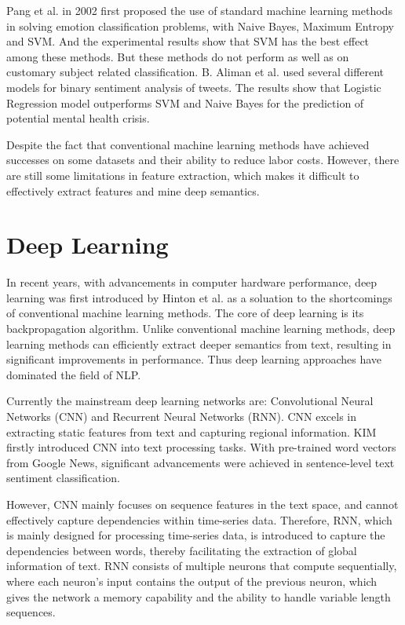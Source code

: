 \documentclass[ %
                    author={Louis Wang},
                supervisor={Dr. Qiang Liu},
                    degree={MSc},
                     title={Identification of Suicide Ideation in Texts},
                      type={},
                      year={2024}]{dissertation}
\begin{document}
Pang et al. in 2002 first proposed the use of standard machine learning methods in solving emotion classification problems, with Naive Bayes, Maximum Entropy and SVM. And the experimental results show that SVM has the best effect among these methods. But these methods do not perform as well as on customary subject related classification.\cite{pang2002thumbs} B. Aliman et al. used several different models for binary sentiment analysis of tweets. The results show that Logistic Regression model outperforms SVM and Naive Bayes for the prediction of potential mental health crisis. \cite{aliman2022sentiment}

Despite the fact that conventional machine learning methods have achieved successes on some datasets and their ability to reduce labor costs. However, there are still some limitations in feature extraction, which makes it difficult to effectively extract features and mine deep semantics.

\section{Deep Learning}
\noindent
In recent years, with advancements in computer hardware performance, deep learning was first introduced by Hinton et al.\cite{hinton2006reducing} as a soluation to the shortcomings of conventional machine learning methods. The core of deep learning is its backpropagation algorithm. Unlike conventional machine learning methods, deep learning methods can efficiently extract deeper semantics from text, resulting in significant improvements in performance. Thus deep learning approaches have dominated the field of NLP.

Currently the mainstream deep learning networks are: Convolutional Neural Networks (CNN)\cite{chua1998cnn} and Recurrent Neural Networks (RNN)\cite{socher2011parsing}. CNN excels in extracting static features from text and capturing regional information. KIM firstly introduced CNN into text processing tasks. With pre-trained word vectors from Google News, significant advancements were achieved in sentence-level text sentiment classification.\cite{2014Convolutional} 

However, CNN mainly focuses on sequence features in the text space, and cannot effectively capture dependencies within time-series data. Therefore, RNN, which is mainly designed for processing time-series data, is introduced to capture the dependencies between words, thereby facilitating the extraction of global information of text. RNN consists of multiple neurons that compute sequentially, where each neuron's input contains the output of the previous neuron, which gives the network a memory capability and the ability to handle variable length sequences.
\end{document}
